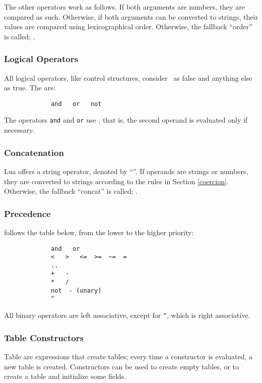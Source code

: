 The other operators work as follows.
If both arguments are numbers, they are compared as such.
Otherwise, if both arguments can be converted to strings,
their values are compared using lexicographical order.
Otherwise, the fallback ``order'' is called; .

\subsubsection{Logical Operators}
All logical operators, like control structures,
consider \nil\ as false and anything else as true.
The  are:
\begin{verbatim}
             and   or   not
\end{verbatim}
The operators \verb'and' and \verb'or' use ,
that is,
the second operand is evaluated only if necessary.

\subsubsection{Concatenation}
Lua offers a string  operator,
denoted by ``''.
If operands are strings or numbers, they are converted to
strings according to the rules in Section \ref{coercion}.
Otherwise, the fallback ``concat'' is called; .

\subsubsection{Precedence}
 follows the table below,
from the lower to the higher priority:
\begin{verbatim}
             and   or
             <   >   <=  >=  ~=  =
             ..
             +   -
             *   /
             not  - (unary)
             ^
\end{verbatim}
All binary operators are left associative, except for \verb'^',
which is right associative.

\subsubsection{Table Constructors} \label{tableconstructor}
Table  are expressions that create tables;
every time a constructor is evaluated, a new table is created.
Constructors can be used to create empty tables,
or to create a table and initialize some fields.

